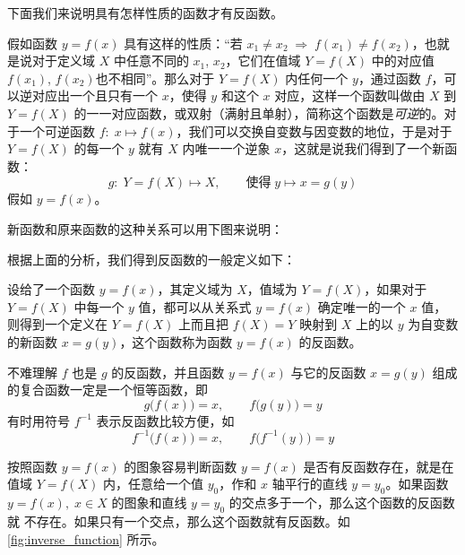 下面我们来说明具有怎样性质的函数才有反函数。

假如函数 $y=f(x)$ 具有这样的性质：“若 $x_1\ne x_2\; \Rightarrow\; f(x_1)\ne f(x_2)$，也就是说对于定义域 $X$ 中任意不同的 $x_1$, $x_2$，它们在值域 $Y=f(X)$ 中的对应值$f(x_1)$, $f(x_2)$也不相同”。那么对于 $Y=f(X)$ 内任何一个 $y$，通过函数 $f$，可以逆对应出一个且只有一个 $x$，使得 $y$ 和这个 $x$ 对应，这样一个函数叫做由 $X$ 到 $Y=f(X)$ 的一一对应函数，或双射（满射且单射），简称这个函数是\emph{可逆}的。对于一个可逆函数 $f:\; x\mapsto f(x)$，我们可以交换自变数与因变数的地位，于是对于 $Y=f(X)$ 的每一个 $y$ 就有 $X$ 内唯一一个逆象 $x$，这就是说我们得到了一个新函数：
\[ g:\; Y=f(X)\mapsto X,\qquad \text{使得}\; y\mapsto x=g(y)\]
假如 $y=f(x)$。

新函数和原来函数的这种关系可以用下图来说明：
\begin{center}
\end{center}

根据上面的分析，我们得到反函数的一般定义如下：
 
\begin{Definition}
  设给了一个函数 $y=f(x)$，其定义域为 $X$，值域为 $Y=f(X)$，如果对于 $Y=f(X)$ 中每一个 $y$ 值，都可以从关系式 $y=f(x)$ 确定唯一的一个 $x$ 值，则得到一个定义在 $Y=f(X)$ 上而且把 $f(X)=Y$ 映射到 $X$ 上的以 $y$ 为自变数的新函数 $x=g(y)$，这个函数称为函数 $y=f(x)$ 的反函数。
\end{Definition}

不难理解 $f$ 也是 $g$ 的反函数，并且函数 $y=f(x)$ 与它的反函数 $x=g(y)$ 组成的复合函数一定是一个恒等函数，即 
\[ g\big(f(x)\big)=x,\qquad f\big(g(y)\big)= y\]
有时用符号 $f^{-1}$ 表示反函数比较方便，如
\[f^{-1}\big(f(x)\big)=x,\qquad f\big(f^{-1}(y)\big)=y\]

按照函数 $y=f(x)$ 的图象容易判断函数 $y=f(x)$ 是否有反函数存在，就是在值域 $Y=f(X)$ 内，任意给一个值 $y_0$，作和 $x$ 轴平行的直线 $y=y_0$。如果函数$y=f(x),\; x\in X$ 的图象和直线 $y=y_0$ 的交点多于一个，那么这个函数的反函数就
不存在。如果只有一个交点，那么这个函数就有反函数。如\cref{fig:inverse_function} 所示。

